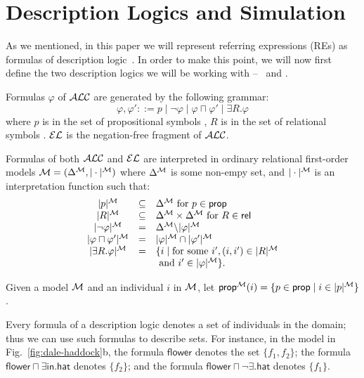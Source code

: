 \section{Description Logics and Simulation} \label{sec:bisim}

As we mentioned, in this paper we will represent referring expressions
(REs) as formulas of description logic~\cite{baad:desc03}.  In order
to make this point, we will now first define the two description
logics we will be working with -- \alc\ and \el.


\begin{definition}
Formulas $\varphi$ of $\mathcal{ALC}$ are generated by the following grammar:
$$
\varphi,\varphi' ::= p \mid \neg \varphi \mid \varphi \sqcap \varphi'
\mid \exists R. \varphi
$$
where $p$ is in the set of propositional symbols \prop, $R$ is in the
set of relational symbols \rel. $\mathcal{EL}$ is the negation-free fragment of $\mathcal{ALC}$.

Formulas of both $\mathcal{ALC}$ and $\mathcal{EL}$ are interpreted in ordinary
relational first-order models $\mathcal{M} = (\Delta^{\mathcal{M}},|\cdot|^{\mathcal{M}})$ where
$\Delta^{\mathcal{M}}$ is some non-empy set, and $|\cdot|^{\mathcal{M}}$ is an
interpretation function such that:
$$
\begin{array}{ccl}
|p|^{\mathcal{M}} & \subseteq & \Delta^{\mathcal{M}}  \mbox{ for $p \in \textsf{prop}$}\\
|R|^{\mathcal{M}} & \subseteq & \Delta^{\mathcal{M}} \times \Delta^{\mathcal{M}}  \mbox{ for $R \in \textsf{rel}$}\\
|\neg \varphi|^{\mathcal{M}} & = & \Delta^{\mathcal{M}} \backslash |\varphi|^{\mathcal{M}}\\
|\varphi \sqcap \varphi'|^{\mathcal{M}} & = & |\varphi|^{\mathcal{M}} \cap |\varphi'|^{\mathcal{M}}\\
|\exists R.\varphi|^{\mathcal{M}} & = & \{i \mid \mbox{for some } i', (i,i') \in |R|^{\mathcal{M}}\\
& & \mbox{ and } i' \in |\varphi|^{\mathcal{M}} \}.\\
\end{array}
$$

Given a model $\mathcal{M}$ and an individual $i$ in $\mathcal{M}$, let
$\textsf{prop}^{\mathcal{M}}(i) = \{p \in \textsf{prop} \mid i \in |p|^{\mathcal{M}}\}$.
\end{definition}

Every formula of a description logic denotes a set of individuals in
the domain; thus we can use such formulas to describe sets.  For
instance, in the model in Fig.~\ref{fig:dale-haddock}b, the formula
$\mathsf{flower}$ denotes the set $\{f_1,f_2\}$; the formula
$\mathsf{flower} \sqcap \exists \mathsf{in}.\mathsf{hat}$ denotes
$\{f_2\}$; and the formula $\mathsf{flower} \sqcap \neg
\exists.\mathsf{hat}$ denotes $\{f_1\}$.

